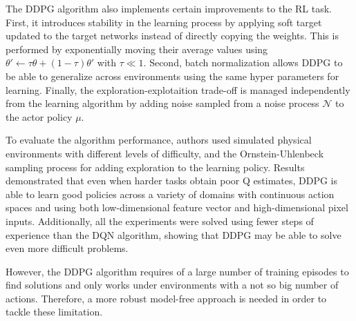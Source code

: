 The DDPG algorithm also implements certain improvements to the RL task. First, it introduces stability in the learning process by applying soft target updated to the target networks instead of directly copying the weights. This is performed by exponentially moving their average values using $\theta' \leftarrow \tau\theta + (1 - \tau)\theta'$ with $\tau \ll 1$. Second, batch normalization allows DDPG to be able to generalize across environments using the same hyper parameters for learning. Finally, the exploration-explotaition trade-off is managed independently from the learning algorithm by adding noise sampled from a noise process $\mathcal{N}$ to the actor policy $\mu$.
%
%

To evaluate the algorithm performance, authors used simulated physical environments with different levels of difficulty, and the Ornstein-Uhlenbeck\cite{bibbona2008ornstein} sampling process for adding exploration to the learning policy. Results demonstrated that even when harder tasks obtain poor Q estimates, DDPG is able to learn good policies across a variety of domains with continuous action spaces and using both low-dimensional feature vector and high-dimensional pixel inputs. Additionally, all the experiments were solved using fewer steps of experience than the DQN algorithm, showing that DDPG may be able to solve even more difficult problems.

However, the DDPG algorithm requires of a large number of training episodes to find solutions and only works under environments with a not so big number of actions. Therefore, a more robust model-free approach is needed in order to tackle these limitation.

